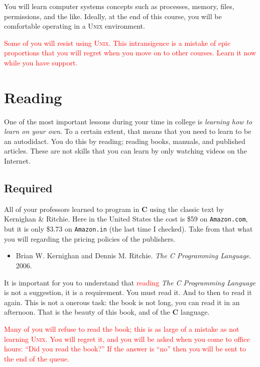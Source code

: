 \documentclass[12pt]{article}
\begin{document}
You will learn computer systems concepts such as processes, memory,
files, permissions, and the like. Ideally, at the end of this course,
you will be comfortable operating in a \textsc{Unix} environment.

\textcolor{red}{Some of you will resist using \textsc{Unix}. This
intransigence is a mistake of epic proportions that you will regret when
you move on to other courses. Learn it now while you have support.}

\section{Reading}

One of the most important lessons during your time in college is
\emph{learning how to learn on your own}. To a certain extent, that
means that you need to learn to be an autodidact. You do this by
reading; reading books, manuals, and published articles. These are not
skills that you can learn by only watching videos on the Internet.

\subsection{Required}

All of your professors learned to program in \textbf{C} using the
classic text by Kernighan \& Ritchie.  Here in the United States the
cost is \$59 on \texttt{Amazon.com}, but it is only \$3.73 on
\texttt{Amazon.in} (the last time I checked).  Take from that what you will
regarding the pricing policies of the publishers.

\begin{itemize}
\item
Brian W. Kernighan and Dennis M. Ritchie. \emph{The C Programming Language}. 2006.
\end{itemize}

It is important for you to understand that \textcolor{red}{reading}
\emph{The C Programming Language} is not a suggestion, it is a
requirement. You must read it. And to then to read it again.  This is
not a onerous task: the book is not long, you can read it in an
afternoon. That is the beauty of this book, and of the \textbf{C}
language.

\textcolor{red}{Many of you will refuse to read the book; this is as
large of a mistake as not learning \textsc{Unix}. You will regret it,
and you will be asked when you come to office hours: ``Did you read the
book?'' If the answer is ``no'' then you will be sent to the end of the
queue.}
\end{document}
